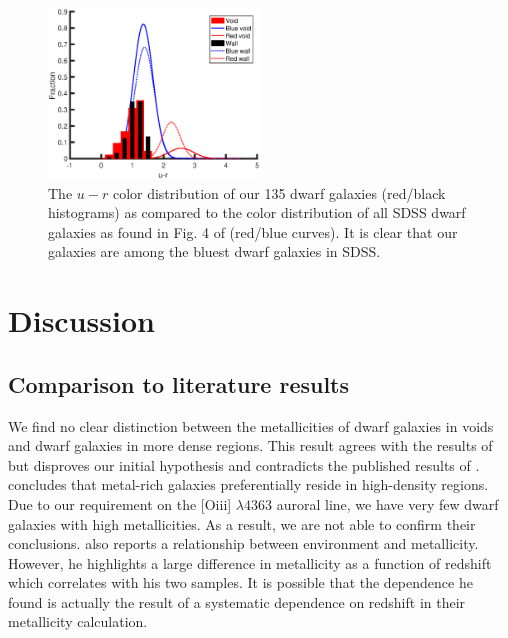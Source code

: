 \begin{figure}
    \centering
    \includegraphics[width=0.5\textwidth]{Images/Paper1/urHist_1sig_I06_dwarf_SF_t3}
    \caption[Color distribution of 135 dwarf galaxy sample compared to SDSS]{The 
    $u-r$ color distribution of our 135 dwarf galaxies (red/black histograms) as 
    compared to the color distribution of all SDSS dwarf galaxies as found in 
    Fig. 4 of \cite{Hoyle12} (red/blue curves).  It is clear that our galaxies 
    are among the bluest dwarf galaxies in SDSS.}
    \label{fig:colorHist}
\end{figure}



\section{Discussion}

\subsection{Comparison to literature results}

We find no clear distinction between the metallicities of dwarf galaxies in 
voids and dwarf galaxies in more dense regions.  This result agrees with the 
results of \citet{Mouhcine07, Cooper08, Nicholls14a, Kreckel15} but disproves 
our initial hypothesis and contradicts the published results of 
\cite{Pustilnik06, Pustilnik11a, Pustilnik14, SanchezAlmeida16}.  
\cite{Cooper08} concludes that metal-rich galaxies preferentially reside in 
high-density regions.  Due to our requirement on the [O{\sc iii}] $\lambda 4363$ 
auroral line, we have very few dwarf galaxies with high metallicities.  As a 
result, we are not able to confirm their conclusions. \cite{Deng11} also reports 
a relationship between environment and metallicity.  However, he highlights a 
large difference in metallicity as a function of redshift which correlates with 
his two samples.  It is possible that the dependence he found is actually the 
result of a systematic dependence on redshift in their metallicity calculation.

